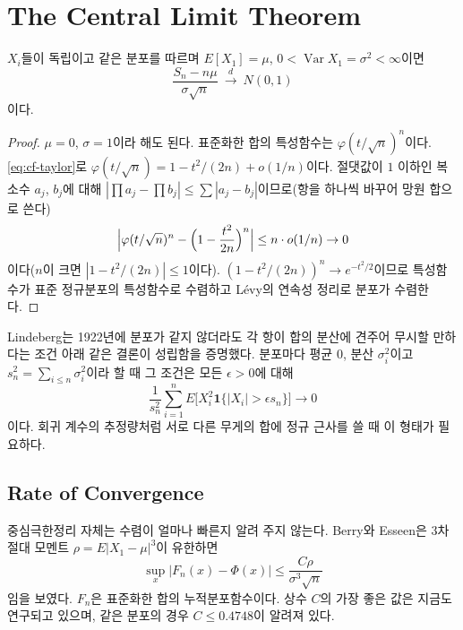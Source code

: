 \section{The Central Limit Theorem}
\label{sec:clt}

\begin{theorem}
\label{thm:clt}
$X_i$들이 독립이고 같은 분포를 따르며 $E[X_1]=\mu$, $0<\operatorname{Var}X_1=\sigma^2<\infty$이면
\[
\frac{S_n-n\mu}{\sigma\sqrt n}\ \xrightarrow{\ d\ }\ N(0,1)
\]
이다.
\end{theorem}

\begin{proof}
$\mu=0$, $\sigma=1$이라 해도 된다. 표준화한 합의 특성함수는 $\varphi(t/\sqrt n)^n$이다. \eqref{eq:cf-taylor}로 $\varphi(t/\sqrt n)=1-t^2/(2n)+o(1/n)$이다. 절댓값이 $1$ 이하인 복소수 $a_j$, $b_j$에 대해 $|\prod a_j-\prod b_j|\le\sum|a_j-b_j|$이므로(항을 하나씩 바꾸어 망원 합으로 쓴다)
\[
\Bigl|\varphi(t/\sqrt n)^n-\Bigl(1-\frac{t^2}{2n}\Bigr)^n\Bigr|\le n\cdot o(1/n)\to0
\]
이다($n$이 크면 $|1-t^2/(2n)|\le1$이다). $(1-t^2/(2n))^n\to e^{-t^2/2}$이므로 특성함수가 표준 정규분포의 특성함수로 수렴하고 Lévy의 연속성 정리로 분포가 수렴한다.
\end{proof}

Lindeberg는 1922년에 분포가 같지 않더라도 각 항이 합의 분산에 견주어 무시할 만하다는 조건 아래 같은 결론이 성립함을 증명했다\cite{lindeberg1922}. 분포마다 평균 $0$, 분산 $\sigma_i^2$이고 $s_n^2=\sum_{i\le n}\sigma_i^2$이라 할 때 그 조건은 모든 $\epsilon>0$에 대해
\[
\frac1{s_n^2}\sum_{i=1}^nE\bigl[X_i^2\mathbf 1\{|X_i|>\epsilon s_n\}\bigr]\to0
\]
이다. 회귀 계수의 추정량처럼 서로 다른 무게의 합에 정규 근사를 쓸 때 이 형태가 필요하다.

\subsection{Rate of Convergence}

중심극한정리 자체는 수렴이 얼마나 빠른지 알려 주지 않는다. Berry\cite{berry1941}와 Esseen은 3차 절대 모멘트 $\rho=E|X_1-\mu|^3$이 유한하면
\[
\sup_x\bigl|F_n(x)-\Phi(x)\bigr|\le\frac{C\rho}{\sigma^3\sqrt n}
\]
임을 보였다. $F_n$은 표준화한 합의 누적분포함수이다. 상수 $C$의 가장 좋은 값은 지금도 연구되고 있으며, 같은 분포의 경우 $C\le0.4748$이 알려져 있다\cite{shevtsova2011}.

